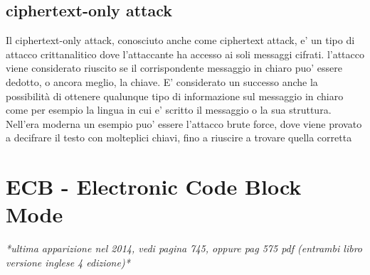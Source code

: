 \subsection{ciphertext-only attack}
Il ciphertext-only attack, conosciuto anche come ciphertext attack, e' un tipo di attacco crittanalitico dove l'attaccante ha accesso ai soli messaggi cifrati. 
l'attacco viene considerato riuscito se il corrispondente messaggio in chiaro puo' essere dedotto, o ancora meglio, la chiave. E' considerato un successo anche la possibilità di ottenere qualunque tipo di informazione sul messaggio in chiaro come per esempio la lingua in cui e' scritto il messaggio o la sua struttura.\\
Nell'era moderna un esempio puo' essere l'attacco brute force, dove viene provato a decifrare il testo con molteplici chiavi, fino a riuscire a trovare quella corretta
\section{ECB - Electronic Code Block Mode}
\textit{*ultima apparizione nel 2014, vedi pagina 745, oppure pag 575 pdf (entrambi libro versione inglese 4 edizione)* }
